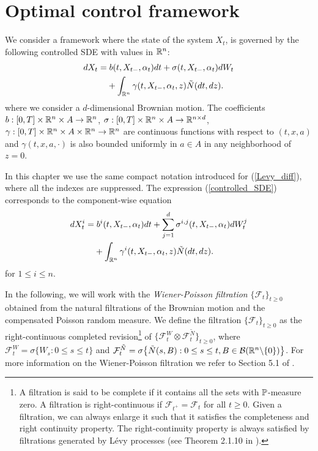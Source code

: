 \section{Optimal control framework}\label{Optimal_control_framework}

We consider a framework where the state of the system $X_t$, is governed by the following controlled SDE with values in $\mathbb{R}^n$:
\begin{align}\label{controlled_SDE}
 dX_t =& \; b(t,X_{t-},\alpha_t) dt + \sigma (t,X_{t-},\alpha_t) dW_t \\ \nonumber
      &+ \int_{\mathbb{R}^n} \gamma(t,X_{t-},\alpha_t,z) \tilde N(dt,dz).
\end{align}
where we consider a $d$-dimensional Brownian motion. 
The coefficients $b: [0,T]\times \mathbb{R}^n \times A \to \mathbb{R}^n$, $\sigma: [0,T]\times \mathbb{R}^n \times A \to \mathbb{R}^{n \times d}$, 
$\gamma: [0,T]\times \mathbb{R}^n \times A \times \mathbb{R}^n \to \mathbb{R}^{n}$ are continuous functions with respect to $(t,x,a)$ and $\gamma(t,x,a,\cdot)$ is also bounded
uniformly in $a \in A$ in any neighborhood of $z=0$. 

In this chapter we use the same compact notation introduced for (\ref{Levy_diff}), where all the indexes are suppressed. The expression (\ref{controlled_SDE}) corresponds to the 
component-wise equation 
\begin{align}
 dX^i_t =& \; b^i(t,X_{t-},\alpha_t) dt + \sum_{j=1}^d \sigma^{i,j} (t,X_{t-},\alpha_t) dW^j_t \\ \nonumber
      &+ \int_{\mathbb{R}^n} \gamma^{i}(t,X_{t-},\alpha_t,z) \tilde N(dt,dz).
\end{align}
for $1 \leq i \leq n$.

In the following, we will work with the \emph{Wiener-Poisson filtration} $\{\mathcal{F}_{t}\}_{t\geq 0}$ obtained from the natural filtrations of the Brownian motion and the compensated 
Poisson random measure. 
We define the filtration $\{\mathcal{F}_{t}\}_{t\geq 0}$ as the right-continuous completed revision\footnote{
A filtration is said to be complete if it contains all the sets with $\mathbb{P}$-measure zero.
A filtration is right-continuous if $\mathcal{F}_{t^+} = \mathcal{F}_{t}$ for all $t\geq 0$.  
Given a filtration, we can always enlarge it such that it satisfies the completeness and right continuity property.
The right-continuity property is always satisfied by filtrations generated by Lévy processes (see Theorem 2.1.10 in \cite{Applebaum}).} 
of $\{ \mathcal{F}_{t}^W \otimes \mathcal{F}_{t}^{\tilde N} \}_{t\geq 0} $, where 
$\mathcal{F}_{t}^W = \sigma\{W_s : 0\leq s \leq t\}$ and 
$\mathcal{F}_{t}^{\tilde N} = \sigma \bigl\{ \tilde N(s,B) : 0\leq s \leq t, B \in \mathcal{B}(\mathbb{R}^n \backslash \{ 0 \})  \bigr\}$.
For more information on the Wiener-Poisson filtration we refer to Section 5.1 of \cite{BoTo11}.

